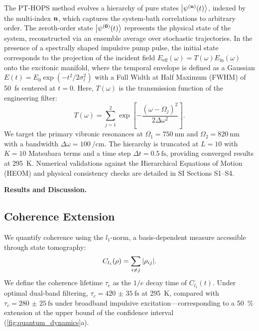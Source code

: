 \documentclass[journal=jpcl,manuscript=letter]{achemso}
\begin{document}
The PT-HOPS method evolves a hierarchy of pure states $\ket{\psi^{(\vb{n})}(t)}$, indexed by the multi-index $\vb{n}$, which captures the system-bath correlations to arbitrary order. The zeroth-order state $\ket{\psi^{(\vb{0})}(t)}$ represents the physical state of the system, reconstructed via an ensemble average over stochastic trajectories. In the presence of a spectrally shaped impulsive pump pulse, the initial state corresponds to the projection of the incident field $E_{\mathrm{eff}}(\omega) = T(\omega) E_{\mathrm{in}}(\omega)$ onto the excitonic manifold, where the temporal envelope is defined as a Gaussian $E(t) = E_0 \exp(-t^2/2\sigma_t^2)$ with a Full Width at Half Maximum (FWHM) of \SI{50}{\femto\second} centered at $t = 0$. Here, $T(\omega)$ is the transmission function of the engineering filter:
\begin{equation}
T(\omega) = \sum_{j=1}^2 \exp\left[ -\frac{(\omega - \Omega_{j})^2}{2\Delta\omega^2} \right].
\label{eq:transmission_function}
\end{equation}
We target the primary vibronic resonances at $\Omega_1 = \SI{750}{\nano\meter}$ and $\Omega_2 = \SI{820}{\nano\meter}$ with a bandwidth $\Delta\omega = \SI{100}{\per\centi\meter}$. The hierarchy is truncated at $L=10$ with $K=10$ Matsubara terms and a time step $\Delta t = \SI{0.5}{\femto\second}$, providing converged results at \SI{295}{\kelvin}. Numerical validations against the Hierarchical Equations of Motion (HEOM) and physical consistency checks are detailed in SI Sections S1--S4.


\textbf{Results and Discussion.}

\subsection*{Coherence Extension}

We quantify coherence using the $l_1$-norm,\cite{Baumgratz2014} a basis-dependent measure accessible through state tomography:
\begin{equation}
C_{l_1}(\rho) = \sum_{i \neq j} \abs{\rho_{ij}}.
\label{eq:l1_coherence}
\end{equation}
We define the coherence lifetime $\tau_c$ as the $1/e$ decay time of $C_{l_1}(t)$. Under optimal dual-band filtering, $\tau_c = \SI{420(35)}{\femto\second}$ at \SI{295}{\kelvin}, compared with $\tau_c = \SI{280(25)}{\femto\second}$ under broadband impulsive excitation---corresponding to a \SI{50}{\percent} extension at the upper bound of the confidence interval (\cref{fig:quantum_dynamics}a).
\end{document}
